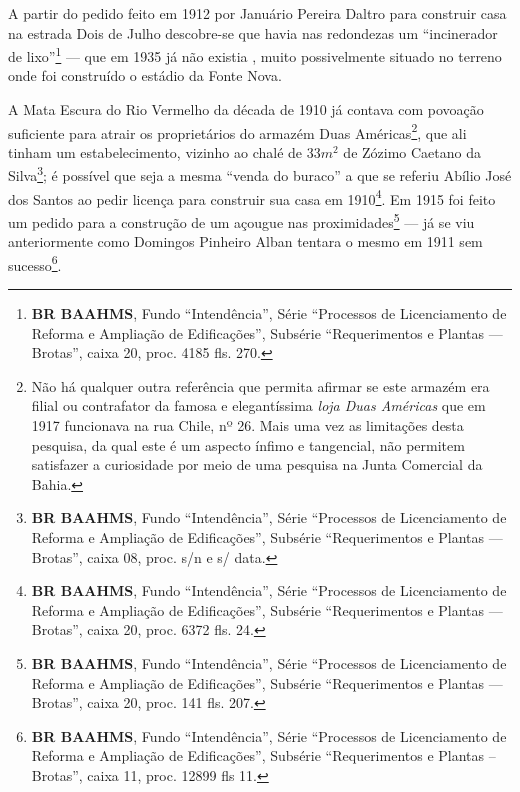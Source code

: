 
A partir do pedido feito em 1912 por Januário Pereira Daltro para construir casa na estrada Dois de Julho descobre-se que havia nas redondezas um ``incinerador de lixo''\footnote{\textbf{BR BAAHMS}, Fundo ``Intendência'', Série ``Processos de Licenciamento de Reforma e Ampliação de Edificações'', Subsérie ``Requerimentos e Plantas --- Brotas'', caixa 20, proc. 4185 fls. 270.} ---  que em 1935 já não existia \cite{souza_guia_1935}, muito possivelmente situado no terreno onde foi construído o estádio da Fonte Nova. 


A Mata Escura do Rio Vermelho da década de 1910 já contava com povoação suficiente para atrair os proprietários do armazém Duas Américas\footnote{Não há qualquer outra referência que permita afirmar se este armazém era filial ou contrafator da famosa e elegantíssima \textit{loja Duas Américas} que em 1917 funcionava na rua Chile, nº 26. Mais uma vez as limitações desta pesquisa, da qual este é um aspecto ínfimo e tangencial, não permitem satisfazer a curiosidade por meio de uma pesquisa na Junta Comercial da Bahia.}, que ali tinham um estabelecimento, vizinho ao chalé de 33$m^{2}$ de Zózimo Caetano da Silva\footnote{\textbf{BR BAAHMS}, Fundo ``Intendência'', Série ``Processos de Licenciamento de Reforma e Ampliação de Edificações'', Subsérie ``Requerimentos e Plantas --- Brotas'', caixa 08, proc. s/n e s/ data.}; é possível que seja a mesma ``venda do buraco'' a que se referiu Abílio José dos Santos ao pedir licença para construir sua casa em 1910\footnote{\textbf{BR BAAHMS}, Fundo ``Intendência'', Série ``Processos de Licenciamento de Reforma e Ampliação de Edificações'', Subsérie ``Requerimentos e Plantas --- Brotas'', caixa 20, proc. 6372 fls. 24.}. Em 1915 foi feito um pedido para a construção de um açougue nas proximidades\footnote{\textbf{BR BAAHMS}, Fundo ``Intendência'', Série ``Processos de Licenciamento de Reforma e Ampliação de Edificações'', Subsérie ``Requerimentos e Plantas --- Brotas'', caixa 20, proc. 141 fls. 207.} --- já se viu anteriormente como Domingos Pinheiro Alban tentara o mesmo em 1911 sem sucesso\footnote{\textbf{BR BAAHMS}, Fundo ``Intendência'', Série ``Processos de Licenciamento de Reforma e Ampliação de Edificações'', Subsérie ``Requerimentos e Plantas – Brotas'', caixa 11, proc. 12899 fls 11.}.


